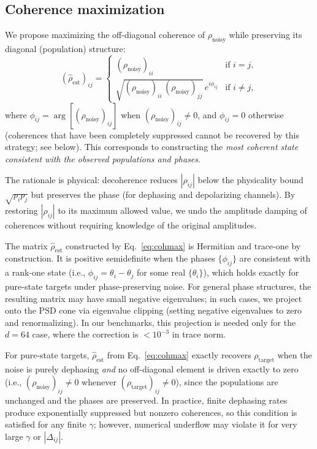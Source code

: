\documentclass[prx,twocolumn,superscriptaddress,longbibliography,floatfix]{revtex4-2}
\newcommand{\rhot}{\rho_\mathrm{target}}
\newcommand{\rhon}{\rho_\mathrm{noisy}}
\newcommand{\rhoe}{\hat{\rho}_\mathrm{est}}
\begin{document}
\subsection{Coherence maximization}
\label{sec:cohmax}

We propose maximizing the off-diagonal coherence of $\rhon$ while preserving its diagonal (population) structure:
\begin{equation}
(\rhoe)_{ij} = \begin{cases}
(\rhon)_{ii} & \text{if } i = j, \\
\sqrt{(\rhon)_{ii}\,(\rhon)_{jj}}\,e^{i\phi_{ij}} & \text{if } i \neq j,
\end{cases}
\label{eq:cohmax}
\end{equation}
where $\phi_{ij} = \arg[(\rhon)_{ij}]$ when $(\rhon)_{ij} \neq 0$, and $\phi_{ij} = 0$ otherwise (coherences that have been completely suppressed cannot be recovered by this strategy; see below).
This corresponds to constructing the \emph{most coherent state consistent with the observed populations and phases}.

The rationale is physical: decoherence reduces $|\rho_{ij}|$ below the physicality bound $\sqrt{p_i p_j}$ but preserves the phase (for dephasing and depolarizing channels).
By restoring $|\rho_{ij}|$ to its maximum allowed value, we undo the amplitude damping of coherences without requiring knowledge of the original amplitudes.

The matrix $\rhoe$ constructed by Eq.~\eqref{eq:cohmax} is Hermitian and trace-one by construction.
It is positive semidefinite when the phases $\{\phi_{ij}\}$ are consistent with a rank-one state (i.e., $\phi_{ij} = \theta_i - \theta_j$ for some real $\{\theta_i\}$), which holds exactly for pure-state targets under phase-preserving noise.
For general phase structures, the resulting matrix may have small negative eigenvalues; in such cases, we project onto the PSD cone via eigenvalue clipping (setting negative eigenvalues to zero and renormalizing).
In our benchmarks, this projection is needed only for the $d = 64$ case, where the correction is $< 10^{-3}$ in trace norm.

For pure-state targets, $\rhoe$ from Eq.~\eqref{eq:cohmax} exactly recovers $\rhot$ when the noise is purely dephasing \emph{and} no off-diagonal element is driven exactly to zero (i.e., $(\rhon)_{ij} \neq 0$ whenever $(\rhot)_{ij} \neq 0$), since the populations are unchanged and the phases are preserved.
In practice, finite dephasing rates produce exponentially suppressed but nonzero coherences, so this condition is satisfied for any finite $\gamma$; however, numerical underflow may violate it for very large $\gamma$ or $|\Delta_{ij}|$.
\end{document}
